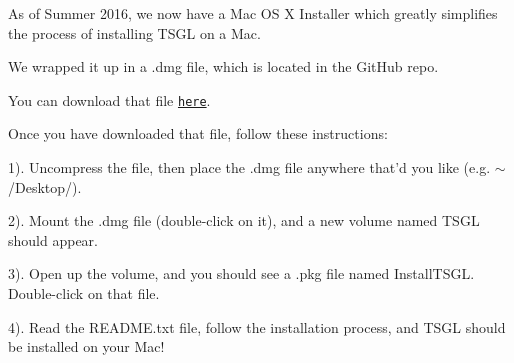 As of Summer 2016, we now have a Mac O\-S X Installer which greatly simplifies the process of installing T\-S\-G\-L on a Mac.

We wrapped it up in a {\ttfamily .dmg} file, which is located in the Git\-Hub repo.

You can download that file \href{https://github.com/Calvin-CS/TSGL/blob/master/MacBinInstaller/TSGL.dmg}{\tt here}.

Once you have downloaded that file, follow these instructions\-:

1). Uncompress the file, then place the {\ttfamily .dmg} file anywhere that'd you like (e.\-g. {\ttfamily $\sim$/\-Desktop/}).

2). Mount the {\ttfamily .dmg} file (double-\/click on it), and a new volume named {\ttfamily T\-S\-G\-L} should appear.

3). Open up the volume, and you should see a {\ttfamily .pkg} file named {\ttfamily Install\-T\-S\-G\-L}. Double-\/click on that file.

4). Read the {\ttfamily R\-E\-A\-D\-M\-E.\-txt} file, follow the installation process, and T\-S\-G\-L should be installed on your Mac! 